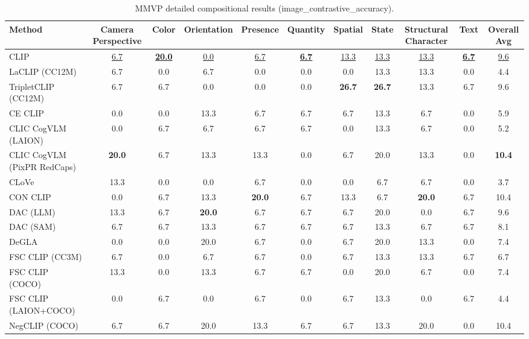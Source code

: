 \begin{table}[t]
  \centering
  \scriptsize
  \caption{MMVP detailed compositional results (image_contrastive_accuracy).}
  \label{tab:MMVP_detailed}
  \begin{adjustbox}{max width=\textwidth}
  \setlength{\tabcolsep}{2pt}
  \begin{tabular}{p{5cm}c|c|c|c|c|c|c|c|c|c}
    \toprule
    Method & Camera Perspective & Color & Orientation & Presence & Quantity & Spatial & State & Structural Character & Text & Overall Avg \\
    \midrule
    CLIP & \underline{6.7} & \underline{\textbf{20.0}} & \underline{0.0} & \underline{6.7} & \underline{\textbf{6.7}} & \underline{13.3} & \underline{13.3} & \underline{13.3} & \underline{\textbf{6.7}} & \underline{9.6} \\
    \midrule
    LaCLIP (CC12M) & 6.7 & 0.0 & 6.7 & 0.0 & 0.0 & 0.0 & 13.3 & 13.3 & 0.0 & 4.4 \\
    TripletCLIP (CC12M) & 6.7 & 6.7 & 0.0 & 0.0 & 0.0 & \textbf{26.7} & \textbf{26.7} & 13.3 & 6.7 & 9.6 \\
    \midrule
    CE CLIP & 0.0 & 0.0 & 13.3 & 6.7 & 6.7 & 6.7 & 13.3 & 6.7 & 0.0 & 5.9 \\
    CLIC CogVLM (LAION) & 0.0 & 6.7 & 6.7 & 6.7 & 6.7 & 0.0 & 13.3 & 6.7 & 0.0 & 5.2 \\
    CLIC CogVLM (PixPR RedCaps) & \textbf{20.0} & 6.7 & 13.3 & 13.3 & 0.0 & 6.7 & 20.0 & 13.3 & 0.0 & \textbf{10.4} \\
    CLoVe & 13.3 & 0.0 & 0.0 & 6.7 & 0.0 & 0.0 & 6.7 & 6.7 & 0.0 & 3.7 \\
    CON CLIP & 0.0 & 6.7 & 13.3 & \textbf{20.0} & 6.7 & 13.3 & 6.7 & \textbf{20.0} & 6.7 & 10.4 \\
    DAC (LLM) & 13.3 & 6.7 & \textbf{20.0} & 6.7 & 6.7 & 6.7 & 20.0 & 0.0 & 6.7 & 9.6 \\
    DAC (SAM) & 6.7 & 6.7 & 13.3 & 6.7 & 6.7 & 6.7 & 13.3 & 6.7 & 6.7 & 8.1 \\
    DeGLA & 0.0 & 0.0 & 20.0 & 6.7 & 0.0 & 6.7 & 20.0 & 13.3 & 0.0 & 7.4 \\
    FSC CLIP (CC3M) & 6.7 & 0.0 & 6.7 & 6.7 & 0.0 & 6.7 & 13.3 & 13.3 & 6.7 & 6.7 \\
    FSC CLIP (COCO) & 13.3 & 0.0 & 13.3 & 6.7 & 6.7 & 0.0 & 20.0 & 6.7 & 0.0 & 7.4 \\
    FSC CLIP (LAION+COCO) & 0.0 & 6.7 & 0.0 & 6.7 & 0.0 & 6.7 & 13.3 & 0.0 & 6.7 & 4.4 \\
    NegCLIP (COCO) & 6.7 & 6.7 & 20.0 & 13.3 & 6.7 & 6.7 & 13.3 & 20.0 & 0.0 & 10.4 \\

\end{tabular}
\end{adjustbox}
\end{table}
